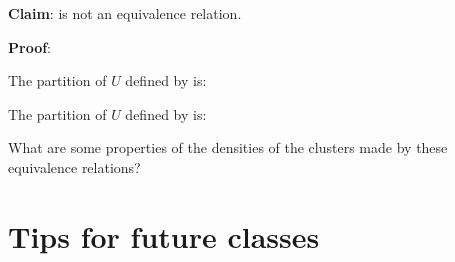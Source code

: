 \documentclass[12pt, oneside]{article}
\begin{document}
{\bf Claim}: \underline{} is not an  equivalence relation.

\vspace{-10pt}

{\bf Proof}:  

\vfill

The partition of  $U$ defined by \underline{} is:

\vfill

The partition of  $U$ defined by \underline{} is:

\vfill


What are some properties of the densities of the clusters made by these equivalence relations?

\newpage
\section*{Tips for future classes}
\end{document}

